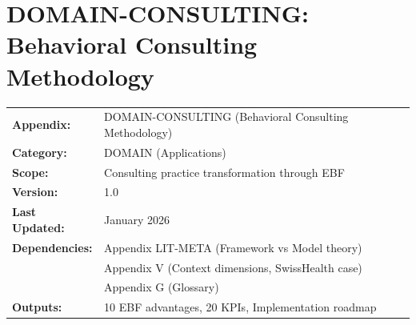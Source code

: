 %
%
%
%
%

\chapter{DOMAIN-CONSULTING: Behavioral Consulting Methodology}
\label{app:domain-consulting}


\begin{tcolorbox}[colback=blue!5!white, colframe=blue!75!black,
    title=\textbf{Appendix DOMAIN-CONSULTING: Application Domain}]

\begin{tabular}{@{}ll@{}}
\textbf{Appendix:} & DOMAIN-CONSULTING (Behavioral Consulting Methodology) \\
\textbf{Category:} & DOMAIN (Applications) \\
\textbf{Scope:} & Consulting practice transformation through EBF \\
\textbf{Version:} & 1.0 \\
\textbf{Last Updated:} & January 2026 \\
\textbf{Dependencies:} & Appendix LIT-META (Framework vs Model theory) \\
 & Appendix V (Context dimensions, SwissHealth case) \\
 & Appendix G (Glossary) \\
\textbf{Outputs:} & 10 EBF advantages, 20 KPIs, Implementation roadmap \\
\end{tabular}

\end{tcolorbox}

